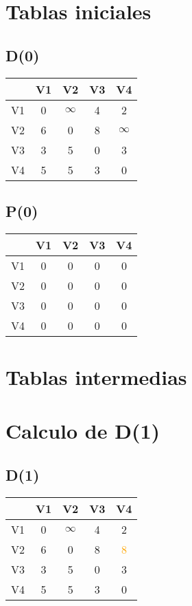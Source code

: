 \documentclass[a4paper,11pt]{article}
\begin{document}
\section*{Tablas iniciales}
\subsection*{D(0)}
\begin{center}
\begin{tabular}{c|cccc}
 & V1 & V2 & V3 & V4 \\ \hline
V1 & 0 & $\infty$ & 4 & 2 \\
V2 & 6 & 0 & 8 & $\infty$ \\
V3 & 3 & 5 & 0 & 3 \\
V4 & 5 & 5 & 3 & 0 \\
\end{tabular}
\end{center}
\subsection*{P(0)}
\begin{center}
\begin{tabular}{c|cccc}
 & V1 & V2 & V3 & V4 \\ \hline
V1 & 0 & 0 & 0 & 0 \\
V2 & 0 & 0 & 0 & 0 \\
V3 & 0 & 0 & 0 & 0 \\
V4 & 0 & 0 & 0 & 0 \\
\end{tabular}
\end{center}
\newpage
\section*{Tablas intermedias}
\section*{Calculo de D(1)}
\subsection*{D(1)}
\begin{center}
\begin{tabular}{c|cccc}
 & V1 & V2 & V3 & V4 \\ \hline
V1 & 0 & $\infty$ & 4 & 2 \\
V2 & 6 & 0 & 8 & \textcolor{orange}{8} \\
V3 & 3 & 5 & 0 & 3 \\
V4 & 5 & 5 & 3 & 0 \\
\end{tabular}
\end{center}
\end{document}
